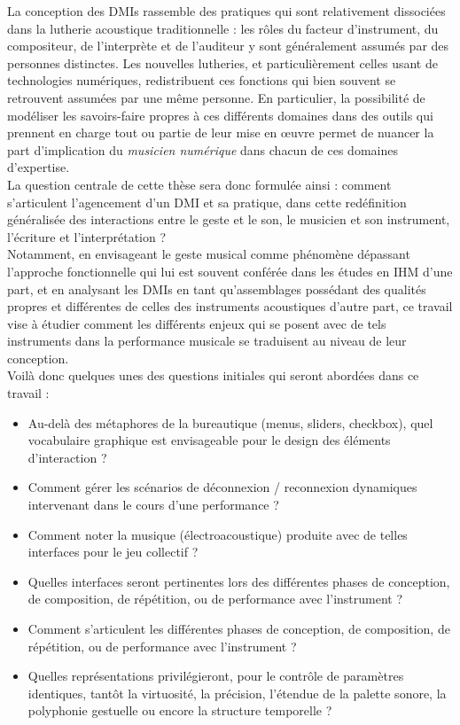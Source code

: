 \noindent La conception des \glspl{DMI} rassemble des pratiques qui sont relativement dissociées dans la lutherie acoustique traditionnelle : les rôles du facteur d'instrument, du compositeur, de l'interprète et de l'auditeur y sont généralement assumés par des personnes distinctes. Les nouvelles lutheries, et particulièrement celles usant de technologies numériques, redistribuent ces fonctions qui bien souvent se retrouvent assumées par une même personne. En particulier, la possibilité de modéliser les savoirs-faire propres à ces différents domaines dans des outils qui prennent en charge tout ou partie de leur mise en œuvre permet de nuancer la part d'implication du \textit{musicien numérique} dans chacun de ces domaines d'expertise.\\
\indent La question centrale de cette thèse sera donc formulée ainsi : comment s'articulent l'agencement d'un \gls{DMI} et sa pratique, dans cette redéfinition généralisée des interactions entre le geste et le son, le musicien et son instrument, l'écriture et l'interprétation ?\\
\indent Notamment, en envisageant le geste musical comme phénomène dépassant l'approche fonctionnelle qui lui est souvent conférée dans les études en \gls{IHM} d'une part, et en analysant les \glspl{DMI} en tant qu'assemblages possédant des qualités propres et différentes de celles des instruments acoustiques d'autre part, ce travail vise à étudier comment les différents enjeux qui se posent avec de tels instruments dans la performance musicale se traduisent au niveau de leur conception.\\
\indent Voilà donc quelques unes des questions initiales qui seront abordées dans ce travail : 
\vspace{-1em}
\begin{itemize}[noitemsep]
\item Au-delà des métaphores de la bureautique (menus, sliders, checkbox), quel vocabulaire graphique est envisageable pour le design des éléments d'interaction ?
\item Comment gérer les scénarios de déconnexion / reconnexion dynamiques intervenant dans le cours d'une performance ?
\item Comment noter la musique (électroacoustique) produite avec de telles interfaces pour le jeu collectif ?
\item Quelles interfaces seront pertinentes lors des différentes phases de conception, de composition, de répétition, ou de performance avec l'instrument ?
\item Comment s'articulent les différentes phases de conception, de composition, de répétition, ou de performance avec l'instrument ?
\item  Quelles représentations privilégieront, pour le contrôle de paramètres identiques, tantôt la virtuosité, la précision, l'étendue de la palette sonore, la polyphonie gestuelle ou encore la structure temporelle ?
\end{itemize}

